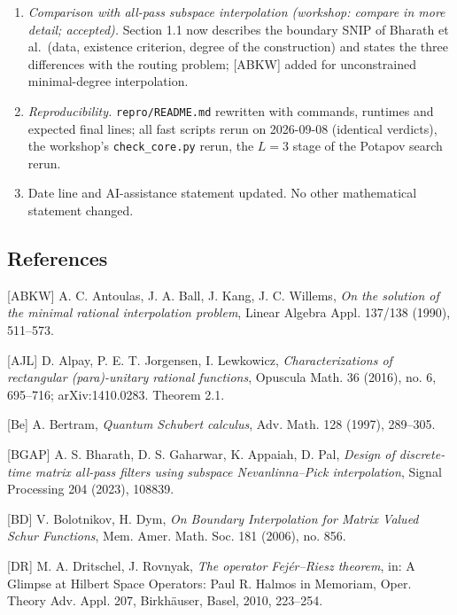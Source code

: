 \documentclass[
  11pt,
  a4paper,
]{article}
\begin{document}
\begin{enumerate}
  computer-assisted. Theorem 7.4 no longer depends on them. Table 2
  gains the \((3,\allowbreak{}6)\), \(L=4,\allowbreak{}5,\allowbreak{}6\) row.
\item
  \emph{Comparison with all-pass subspace interpolation (workshop:
  compare in more detail; accepted).} Section 1.1 now describes the
  boundary SNIP of Bharath et al.~(data, existence criterion, degree of
  the construction) and states the three differences with the routing
  problem; {[}ABKW{]} added for unconstrained minimal-degree
  interpolation.
\item
  \emph{Reproducibility.} {\small\texttt{repro/\allowbreak{}README.\allowbreak{}md}} rewritten with
  commands, runtimes and expected final lines; all fast scripts rerun on
  2026-09-08 (identical verdicts), the workshop's
  {\small\texttt{check\_\allowbreak{}core.\allowbreak{}py}} rerun, the \(L=3\) stage of the Potapov search
  rerun.
\item
  Date line and AI-assistance statement updated. No other mathematical
  statement changed.
\end{enumerate}

\subsection{References}\label{references}

{[}ABKW{]} A. C. Antoulas, J. A. Ball, J. Kang, J. C. Willems, \emph{On
the solution of the minimal rational interpolation problem}, Linear
Algebra Appl. 137/138 (1990), 511--573.

{[}AJL{]} D. Alpay, P. E. T. Jorgensen, I. Lewkowicz,
\emph{Characterizations of rectangular (para)-unitary rational
functions}, Opuscula Math. 36 (2016), no. 6, 695--716; arXiv:1410.0283.
Theorem 2.1.

{[}Be{]} A. Bertram, \emph{Quantum Schubert calculus}, Adv. Math. 128
(1997), 289--305.

{[}BGAP{]} A. S. Bharath, D. S. Gaharwar, K. Appaiah, D. Pal,
\emph{Design of discrete-time matrix all-pass filters using subspace
Nevanlinna--Pick interpolation}, Signal Processing 204 (2023), 108839.

{[}BD{]} V. Bolotnikov, H. Dym, \emph{On Boundary Interpolation for
Matrix Valued Schur Functions}, Mem. Amer. Math. Soc. 181 (2006), no.
856.

{[}DR{]} M. A. Dritschel, J. Rovnyak, \emph{The operator Fejér--Riesz
theorem}, in: A Glimpse at Hilbert Space Operators: Paul R. Halmos in
Memoriam, Oper. Theory Adv. Appl. 207, Birkhäuser, Basel, 2010,
223--254.
\end{document}
